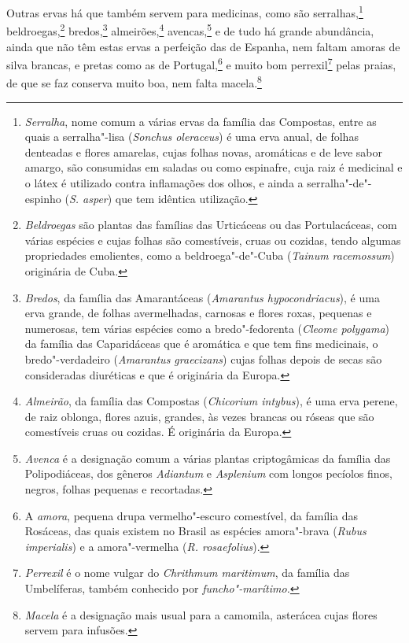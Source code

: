 \begin{linenumbers}
Outras ervas há que também servem para medicinas, como são
serralhas,\footnote{ \textit{Serralha}, nome comum a várias ervas da
família das Compostas, entre as quais a serralha"-lisa (\textit{Sonchus
oleraceus}) é uma erva anual, de folhas denteadas e flores amarelas,
cujas folhas novas, aromáticas e de leve sabor amargo, são consumidas
em saladas ou como espinafre, cuja raiz é medicinal e o látex é
utilizado contra inflamações dos olhos, e ainda a serralha"-de"-espinho
(\textit{S. asper}) que tem idêntica utilização.} 
beldroegas,\footnote{ \textit{Beldroegas} são plantas das famílias das
Urticáceas ou das Portulacáceas, com várias espécies e cujas folhas são
comestíveis, cruas ou cozidas, tendo algumas propriedades emolientes,
como a beldroega"-de"-Cuba (\textit{Tainum racemossum}) originária de
Cuba.} bredos,\footnote{ \textit{Bredos}, da família das
Amarantáceas (\textit{Amarantus hypocondriacus}), é uma erva grande, de
folhas avermelhadas, carnosas e flores roxas, pequenas e numerosas, tem
várias espécies como a bredo"-fedorenta (\textit{Cleome polygama}) da
família das Caparidáceas que é aromática e que tem fins medicinais, o
bredo"-verdadeiro (\textit{Amarantus graecizans}) cujas folhas depois de
secas são consideradas diuréticas e que é originária da Europa.} 
almeirões,\footnote{ \textit{Almeirão}, da família das Compostas
(\textit{Chicorium intybus}), é uma erva perene, de raiz oblonga, flores
azuis, grandes, às vezes brancas ou róseas que são comestíveis cruas ou
cozidas. É originária da Europa.} avencas,\footnote{ \textit{Avenca} 
é a designação comum a várias plantas criptogâmicas
da família das Polipodiáceas, dos gêneros \textit{Adiantum} e 
\textit{Asplenium} com longos pecíolos finos, negros, folhas pequenas e
recortadas.} e de tudo há grande abundância, ainda que não têm estas
ervas a perfeição das de Espanha, nem faltam amoras de silva brancas, e
pretas como as de Portugal,\footnote{ A \textit{amora}, pequena drupa
vermelho"-escuro comestível, da família das Rosáceas, das quais existem
no Brasil as espécies amora"-brava (\textit{Rubus imperialis}) e a
amora"-vermelha (\textit{R. rosaefolius}).} e muito bom 
perrexil\footnote{ \textit{Perrexil} é o nome vulgar do \textit{Chrithmum
maritimum}, da família das Umbelíferas, também conhecido por
\textit{funcho"-marítimo.}} pelas praias, de que se faz conserva muito
boa, nem falta macela.\footnote{ \textit{Macela} é a designação mais
usual para a camomila, asterácea cujas flores servem para infusões.} 


\end{linenumbers}
